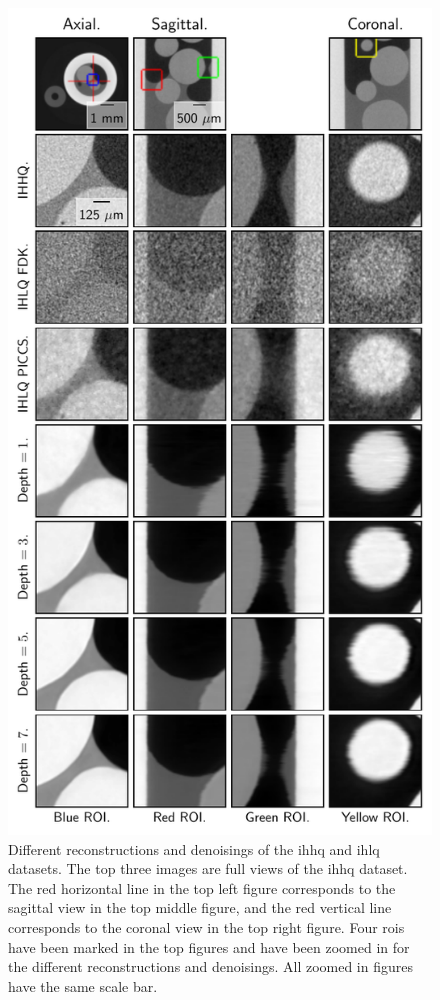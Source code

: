 \begin{figure}[htbp]
  \centering
  \includegraphics[width=.77\textwidth]{figures/bigfigure.pdf}
  \caption[Different reconstructions and denoisings of the IHLQ and IHHQ datasets]{Different reconstructions and denoisings of the \gls{ihhq} and \gls{ihlq} datasets. The top three images are full views of the \gls{ihhq} dataset. The red horizontal line in the top left figure corresponds to the sagittal view in the top middle figure, and the red vertical line corresponds to the coronal view in the top right figure. Four \glspl{roi} have been marked in the top figures and have been zoomed in for the different reconstructions and denoisings. All zoomed in figures have the same scale bar. }
  \label{fig:bigfigure}
\end{figure}

